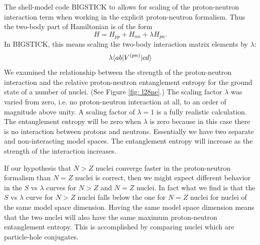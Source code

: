 The shell-model code BIGSTICK to allows for scaling of the proton-neutron 
interaction term when working in the explicit proton-neutron 
formalism. Thus the two-body part of Hamiltonian is of the form
\begin{equation}
    H = H_{pp} + H_{nn} + \lambda H_{pn}.
\end{equation}
In BIGSTICK, this means scaling the two-body interaction
matrix elements by $\lambda$:
\begin{equation}
    \lambda\langle ab|V^{(pn)}|cd\rangle
\end{equation}
We examined the relationship between the strength of the 
proton-neutron interaction and the relative proton-neutron 
entanglement entropy for the ground state of a number of 
nuclei. (See Figure \ref{fig: l28ne}.)
The scaling factor $\lambda$ was varied from zero, i.e.
no proton-neutron interaction at all, to an order of magnitude
above unity. A scaling factor of $\lambda=1$ is a fully realistic 
calculation.
The entanglement 
entropy will be zero when $\lambda$ is zero because in this
case there is no interaction between protons and neutrons. 
Essentially we have two separate and non-interacting 
model spaces. The entanglement entropy will increase as
the strength of the interaction increases. 

If our hypothesis that $N>Z$ nuclei converge faster in the 
proton-neutron formalism than $N=Z$ nuclei is correct, then 
we might expect different behavior in the
$S$ vs $\lambda$ curves for $N>Z$ and $N=Z$ nuclei.
In fact what we find is that the $S$ vs $\lambda$
curve for $N>Z$ nuclei falls below the one for $N=Z$ 
nuclei for nuclei of the same model space dimension.
Having the same model space dimension means that
the two nuclei will also have the same maximum 
proton-neutron entanglement entropy.
This is accomplished by comparing nuclei which are
particle-hole conjugates.

